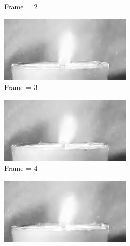 \documentclass[a4paper, landscape]{article}
\begin{document}
\begin{figure}[H]
\begin{subfigure}{0.13\linewidth}
		\caption{Frame = 2}
	\end{subfigure}
	\begin{subfigure}{0.13\linewidth}
		\centering
		\includegraphics[width=\linewidth]{flame/reconstructed, T = 5, frame = 3.png}
		\caption{Frame = 3}
	\end{subfigure}
	\begin{subfigure}{0.13\linewidth}
		\centering
		\includegraphics[width=\linewidth]{flame/reconstructed, T = 5, frame = 4.png}
		\caption{Frame = 4}
	\end{subfigure}
	\begin{subfigure}{0.13\linewidth}
		\centering
		\includegraphics[width=\linewidth]{flame/reconstructed, T = 5, frame = 5.png}

\end{subfigure}
\end{figure}
\end{document}
